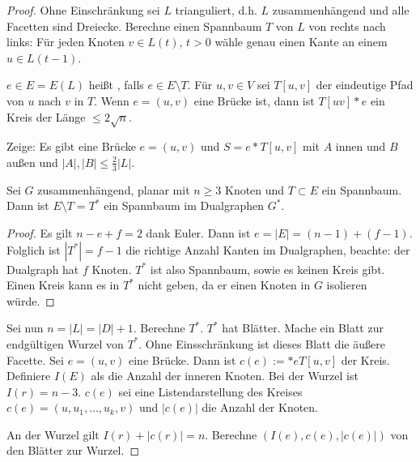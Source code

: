 \begin{st}
\begin{proof}
        Ohne Einschränkung sei $L$ trianguliert, d.h. $L$ zusammenhängend und alle Facetten sind Dreiecke.
        Berechne einen Spannbaum $T$ von $L$ von rechts nach links:
        Für jeden Knoten $v \in L(t)$, $t > 0$ wähle genau einen Kante an einem $u \in L(t-1)$.

        $e \in E = E(L)$ heißt , falls $e \in E \setminus T$.
        Für $u, v \in V$ sei $T[u,v]$ der eindeutige Pfad von $u$ nach $v$ in $T$.
        Wenn $e = (u,v)$ eine Brücke ist, dann ist $T[uv] \ast e$ ein Kreis der Länge $\le 2\sqrt n$.

        Zeige: Es gibt eine Brücke $e = (u,v)$ und $S = e \ast T[u,v]$ mit $A$ innen und $B$ außen und $|A|, |B| \le \frac{2}{3} |L|$.

        \begin{lem}
            Sei $G$ zusammenhängend, planar mit $n \ge 3$ Knoten und $T \subset E$ ein Spannbaum.
            Dann ist $E \setminus T = T^*$ ein Spannbaum im Dualgraphen $G^*$.
            \begin{proof}
                Es gilt $n - e + f = 2$ dank Euler.
                Dann ist $e = |E| = (n-1) + (f-1)$.
                Folglich ist $|T^*| = f - 1$ die richtige Anzahl Kanten im Dualgraphen, beachte: der Dualgraph hat $f$ Knoten.
                $T^*$ ist also Spannbaum, sowie es keinen Kreis gibt.
                Einen Kreis kann es in $T^*$ nicht geben, da er einen Knoten in $G$ isolieren würde.
            \end{proof}
        \end{lem}

        Sei nun $n = |L| = |D| + 1$.
        Berechne $T^*$.
        $T^*$ hat Blätter.
        Mache ein Blatt zur endgültigen Wurzel von $T^*$.
        Ohne Einsschränkung ist dieses Blatt die äußere Facette.
        Sei $e = (u,v)$ eine Brücke.
        Dann ist $c(e) := \ast e T[u,v]$ der Kreis.
        Definiere $I(E)$ als die Anzahl der inneren Knoten.
        Bei der Wurzel ist $I(r) = n - 3$.
        $c(e)$ sei eine Listendarstellung des Kreises $c(e) = (u, u_1, \dotsc, u_k, v)$ und $|c(e)|$ die Anzahl der Knoten.

        An der Wurzel gilt $I(r) + |c(r)| = n$.
        Berechne $(I(e), c(e), |c(e)|)$ von den Blätter zur Wurzel.


\end{proof}
\end{st}
